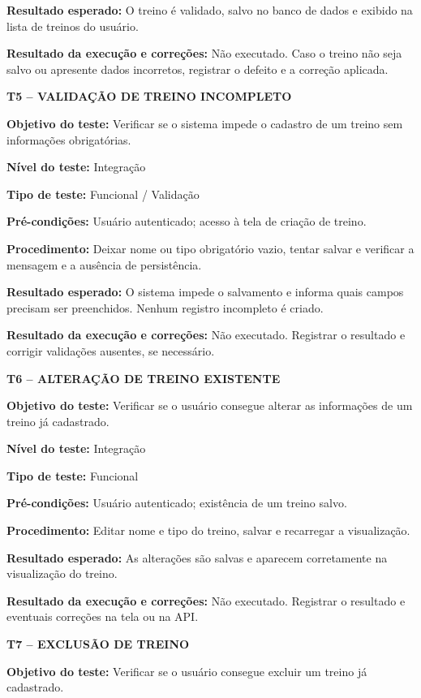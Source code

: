 \noindent\textbf{Resultado esperado:} O treino é validado, salvo no banco de dados e exibido na lista de treinos do usuário.

\noindent\textbf{Resultado da execução e correções:} Não executado. Caso o treino não seja salvo ou apresente dados incorretos, registrar o defeito e a correção aplicada.

\textbf{T5 -- VALIDAÇÃO DE TREINO INCOMPLETO}

\noindent\textbf{Objetivo do teste:} Verificar se o sistema impede o cadastro de um treino sem informações obrigatórias.

\noindent\textbf{Nível do teste:} Integração

\noindent\textbf{Tipo de teste:} Funcional / Validação

\noindent\textbf{Pré-condições:} Usuário autenticado; acesso à tela de criação de treino.

\noindent\textbf{Procedimento:} Deixar nome ou tipo obrigatório vazio, tentar salvar e verificar a mensagem e a ausência de persistência.

\noindent\textbf{Resultado esperado:} O sistema impede o salvamento e informa quais campos precisam ser preenchidos. Nenhum registro incompleto é criado.

\noindent\textbf{Resultado da execução e correções:} Não executado. Registrar o resultado e corrigir validações ausentes, se necessário.

\textbf{T6 -- ALTERAÇÃO DE TREINO EXISTENTE}

\noindent\textbf{Objetivo do teste:} Verificar se o usuário consegue alterar as informações de um treino já cadastrado.

\noindent\textbf{Nível do teste:} Integração

\noindent\textbf{Tipo de teste:} Funcional

\noindent\textbf{Pré-condições:} Usuário autenticado; existência de um treino salvo.

\noindent\textbf{Procedimento:} Editar nome e tipo do treino, salvar e recarregar a visualização.

\noindent\textbf{Resultado esperado:} As alterações são salvas e aparecem corretamente na visualização do treino.

\noindent\textbf{Resultado da execução e correções:} Não executado. Registrar o resultado e eventuais correções na tela ou na API.

\textbf{T7 -- EXCLUSÃO DE TREINO}

\noindent\textbf{Objetivo do teste:} Verificar se o usuário consegue excluir um treino já cadastrado.


